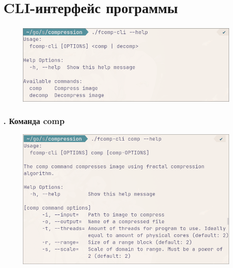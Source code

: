 \documentclass[t aspectratio=169]{beamer}
\begin{document}
  \section{CLI-интерфейс программы}
  \begin{frame}\frametitle{\insertsection}
   \begin{figure}
    \begin{center}
      \includegraphics[width=\textwidth]{./images/cli-main.png}
    \end{center}
   \end{figure}
  \end{frame}

  \begin{frame}\frametitle{\insertsection. Команда comp}
   \begin{figure}
    \begin{center}
      \includegraphics[width=\textwidth]{./images/cli-comp.png}
    \end{center}
   \end{figure}
  \end{frame}
\end{document}
